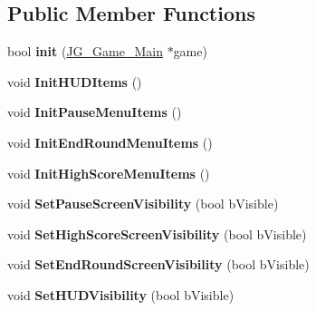 \subsection*{Public Member Functions}
\begin{DoxyCompactItemize}
\item 
\hypertarget{class_j_g___game___g_u_i_ab796ce7767e6ab638449f6c5bd7ec905}{bool {\bfseries init} (\hyperlink{class_j_g___game___main}{J\-G\-\_\-\-Game\-\_\-\-Main} $\ast$game)}\label{class_j_g___game___g_u_i_ab796ce7767e6ab638449f6c5bd7ec905}

\item 
\hypertarget{class_j_g___game___g_u_i_a66308f118acf73c0bec5fa362e64a241}{void {\bfseries Init\-H\-U\-D\-Items} ()}\label{class_j_g___game___g_u_i_a66308f118acf73c0bec5fa362e64a241}

\item 
\hypertarget{class_j_g___game___g_u_i_a37b354adcbf5ac6cf3076b3c0f6d188d}{void {\bfseries Init\-Pause\-Menu\-Items} ()}\label{class_j_g___game___g_u_i_a37b354adcbf5ac6cf3076b3c0f6d188d}

\item 
\hypertarget{class_j_g___game___g_u_i_af4abc70383f754ee38e1e4c9d0e74de4}{void {\bfseries Init\-End\-Round\-Menu\-Items} ()}\label{class_j_g___game___g_u_i_af4abc70383f754ee38e1e4c9d0e74de4}

\item 
\hypertarget{class_j_g___game___g_u_i_a9d60bb38da03ace5804313a274d4ccb7}{void {\bfseries Init\-High\-Score\-Menu\-Items} ()}\label{class_j_g___game___g_u_i_a9d60bb38da03ace5804313a274d4ccb7}

\item 
\hypertarget{class_j_g___game___g_u_i_ac22f4e7566364d26fb4291dee43febb5}{void {\bfseries Set\-Pause\-Screen\-Visibility} (bool b\-Visible)}\label{class_j_g___game___g_u_i_ac22f4e7566364d26fb4291dee43febb5}

\item 
\hypertarget{class_j_g___game___g_u_i_ae0827ac4c62da200bd4dbef8cc84746d}{void {\bfseries Set\-High\-Score\-Screen\-Visibility} (bool b\-Visible)}\label{class_j_g___game___g_u_i_ae0827ac4c62da200bd4dbef8cc84746d}

\item 
\hypertarget{class_j_g___game___g_u_i_ad89a4556220ea6d5f6b974968efe21e2}{void {\bfseries Set\-End\-Round\-Screen\-Visibility} (bool b\-Visible)}\label{class_j_g___game___g_u_i_ad89a4556220ea6d5f6b974968efe21e2}

\item 
\hypertarget{class_j_g___game___g_u_i_aa1d4ffd2fb4eb61d3c5dd7e5e5e2b490}{void {\bfseries Set\-H\-U\-D\-Visibility} (bool b\-Visible)}\label{class_j_g___game___g_u_i_aa1d4ffd2fb4eb61d3c5dd7e5e5e2b490}


\end{DoxyCompactItemize}
